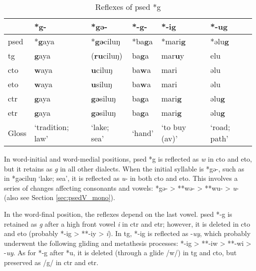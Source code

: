 \begin{table}[!htbp]
\centering
\caption{Reflexes of \acl{psed} *g}
\label{tab:psed_g}
\begin{tabular}{llllll}
\hline
           & *g-              & *gə-     & *-g-   & *-i\textbf{g}              & *-u\textbf{g}         \\ \hline
\acs{psed} & *\textbf{g}aya   & *\textbf{gə}ciluŋ & *ba\textbf{g}a  & *mari\textbf{g}            & *əlu\textbf{g}        \\ \hdashline
\acs{tg}   & \textbf{g}aya    & (\textbf{ru}ciluŋ)& ba\textbf{g}a   & mar\textbf{u}y             & elu          \\
\acs{cto}  & \textbf{w}aya    & \textbf{u}ciluŋ   & ba\textbf{w}a   & mari              & əlu          \\
\acs{eto}  & \textbf{w}aya    & \textbf{u}siluŋ   & ba\textbf{w}a   & mari                  & əlu             \\
\acs{ctr}  & \textbf{g}aya    & \textbf{gə}siluŋ  & ba\textbf{g}a   & mari\textbf{g}             & əlu\textbf{g}         \\
\acs{etr}  & \textbf{g}aya    & \textbf{gə}siluŋ  & ba\textbf{g}a   & mari\textbf{g}             & əlu\textbf{g}         \\ \hline
Gloss      & `tradition; law' & `lake; sea'       & `hand' & `to buy (\acs{av})' & `road; path' \\ \hline
\end{tabular}
\end{table}

In word-initial and word-medial positions, \acl{psed} *g is reflected as \textit{w} in \acl{cto} and \acl{eto}, but it retains as \textit{g} in all other dialects. When the initial syllable is *gə-, such as in *gəciluŋ `lake; sea', it is reflected as \textit{u}- in both \acl{cto} and \acl{eto}. This involves a series of changes affecting consonants and vowels: *gə- > **wə- > **wu- > \textit{u}- (also see Section \ref{sec:psedV_mono}).

In the word-final position, the reflexes depend on the last vowel. \acl{psed} *-g is retained as \textit{g} after a high front vowel \textit{i} in \acl{ctr} and \acl{etr}; however, it is deleted in \acl{cto} and \acl{eto} (probably *-ig > **-iy > \textit{i}). In \acl{tg}, *-ig is reflected as -\textit{uy}, which probably underwent the following gliding and metathesis processes: *-ig > **-iw > **-wi > -\textit{uy}. As for *-g after *u, it is deleted (through a glide /w/) in \acl{tg} and \acl{cto}, but preserved as /g/ in \acl{ctr} and \acl{etr}. 

